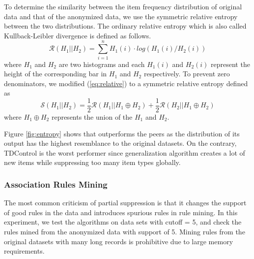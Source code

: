 To determine the similarity between the item frequency distribution
of original data and that of the anonymized data,
we use the symmetric relative entropy between the two distributions.
The ordinary relative entropy
\cite{Lin91divergencemeasures} which is also called Kullback-Leibler
divergence is defined as follows.
\begin{equation} \label{eq:relative}
\mathcal{R}(H_1||H_2)=\sum_{i=1}^{n}H_1(i)\cdot log(H_1(i)/H_2(i))
\end{equation}
where $H_1$ and $H_2$ are two histograms and each $H_1(i)$ and $H_2(i)$ represent the height of the corresponding bar in $H_1$ and $H_2$ respectively.
To prevent zero denominators, we modified (\ref{eq:relative})
to a symmetric relative entropy \cite{Fisher:2008:DSF} defined as
\[\mathcal{S}(H_1||H_2)=\frac{1}{2}\mathcal R( H_1||H_1 \oplus H_2)+\frac{1}{2}\mathcal R( H_2||H_1 \oplus H_2)\]
where  $H_1 \oplus H_2$ represents the union of the $H_1$ and $H_2$.

Figure \ref{fig:entropy} shows that \PartialR outperforms the peers
as the distribution of its output has the highest resemblance
to the original datasets.
On the contrary, TDControl is the worst performer
since generalization algorithm creates a lot of new items while
suppressing too many item types globally.


\subsubsection{Association Rules Mining}\label{sec:eval:rulemining}
The most common criticism of partial suppression is that it
changes the support of good rules in the data and introduces spurious
rules in rule mining. In this experiment, we test the algorithms on
data sets with cutoff = 5, and check the rules mined from the anonymized data
with support of 5. Mining rules from the original datasets with many
long records is prohibitive due to large memory requirements.

